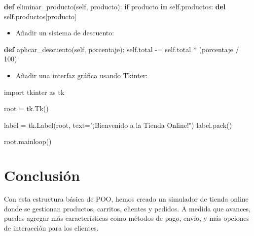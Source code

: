 \documentclass[
  a4paper,
  DIV=11,
  numbers=noendperiod,
  onepage,
  openany]{scrreprt}
\newenvironment{Shaded}{\begin{snugshade}}{\end{snugshade}}
\newcommand{\ControlFlowTok}[1]{\textcolor[rgb]{0.00,0.23,0.31}{\textbf{#1}}}
\newcommand{\DecValTok}[1]{\textcolor[rgb]{0.68,0.00,0.00}{#1}}
\newcommand{\ImportTok}[1]{\textcolor[rgb]{0.00,0.46,0.62}{#1}}
\newcommand{\KeywordTok}[1]{\textcolor[rgb]{0.00,0.23,0.31}{\textbf{#1}}}
\newcommand{\NormalTok}[1]{\textcolor[rgb]{0.00,0.23,0.31}{#1}}
\newcommand{\OperatorTok}[1]{\textcolor[rgb]{0.37,0.37,0.37}{#1}}
\newcommand{\StringTok}[1]{\textcolor[rgb]{0.13,0.47,0.30}{#1}}
\newcommand{\VariableTok}[1]{\textcolor[rgb]{0.07,0.07,0.07}{#1}}
\providecommand{\tightlist}{%
  \setlength{\itemsep}{0pt}\setlength{\parskip}{0pt}}\usepackage{longtable,booktabs,array}
\begin{document}
\begin{Shaded}
\begin{Highlighting}[]
\KeywordTok{def}\NormalTok{ eliminar\_producto(}\VariableTok{self}\NormalTok{, producto):}
    \ControlFlowTok{if}\NormalTok{ producto }\KeywordTok{in} \VariableTok{self}\NormalTok{.productos:}
        \KeywordTok{del} \VariableTok{self}\NormalTok{.productos[producto]}
\end{Highlighting}
\end{Shaded}

\begin{itemize}
\tightlist
\item
  Añadir un sistema de descuento:
\end{itemize}

\begin{Shaded}
\begin{Highlighting}[]
\KeywordTok{def}\NormalTok{ aplicar\_descuento(}\VariableTok{self}\NormalTok{, porcentaje):}
    \VariableTok{self}\NormalTok{.total }\OperatorTok{{-}=} \VariableTok{self}\NormalTok{.total }\OperatorTok{*}\NormalTok{ (porcentaje }\OperatorTok{/} \DecValTok{100}\NormalTok{)}
\end{Highlighting}
\end{Shaded}

\begin{itemize}
\tightlist
\item
  Añadir una interfaz gráfica usando Tkinter:
\end{itemize}

\begin{Shaded}
\begin{Highlighting}[]
\ImportTok{import}\NormalTok{ tkinter }\ImportTok{as}\NormalTok{ tk}

\NormalTok{root }\OperatorTok{=}\NormalTok{ tk.Tk()}

\NormalTok{label }\OperatorTok{=}\NormalTok{ tk.Label(root, text}\OperatorTok{=}\StringTok{"¡Bienvenido a la Tienda Online!"}\NormalTok{)}
\NormalTok{label.pack()}

\NormalTok{root.mainloop()}
\end{Highlighting}
\end{Shaded}

\chapter{Conclusión}\label{conclusiuxf3n-6}

Con esta estructura básica de POO, hemos creado un simulador de tienda
online donde se gestionan productos, carritos, clientes y pedidos. A
medida que avances, puedes agregar más características como métodos de
pago, envío, y más opciones de interacción para los clientes.
\end{document}
